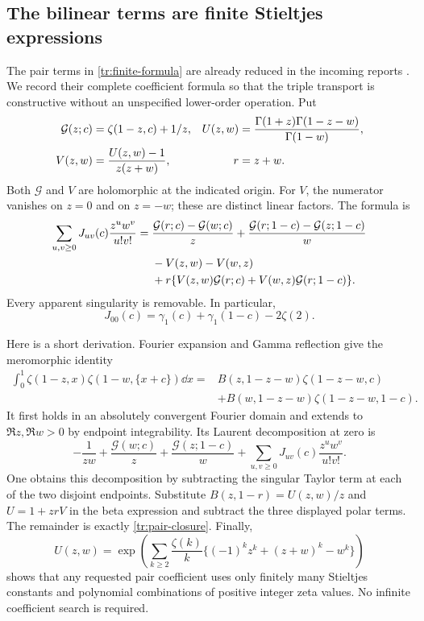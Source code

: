 \subsection{The bilinear terms are finite Stieltjes expressions}
The pair terms in \eqref{tr:finite-formula} are already reduced in the
incoming reports \cite{incoming-sh,incoming-md}. We record their complete
coefficient formula so that the triple transport is constructive without
an unspecified lower-order operation. Put
\begin{align}
 \mathcal G(z;c)&=\zeta(1-z,c)+1/z,
 & U(z,w)&=\frac{\Gamma(1+z)\Gamma(1-z-w)}{\Gamma(1-w)},\notag\\
 V(z,w)&=\frac{U(z,w)-1}{z(z+w)},
 &r&=z+w.\label{tr:pair-generators}
\end{align}
Both $\mathcal G$ and $V$ are holomorphic at the indicated origin. For
$V$, the numerator vanishes on $z=0$ and on $z=-w$; these are distinct
linear factors. The formula is
\begin{align}
 \sum_{u,v\geq0}J_{uv}(c)\frac{z^uw^v}{u!v!}
 ={}&\frac{\mathcal G(r;c)-\mathcal G(w;c)}z
     +\frac{\mathcal G(r;1-c)-\mathcal G(z;1-c)}w\notag\\
 &-V(z,w)-V(w,z)\notag\\
 &+r\{V(z,w)\mathcal G(r;c)
           +V(w,z)\mathcal G(r;1-c)\}.\label{tr:pair-closure}
\end{align}
Every apparent singularity is removable. In particular,
\begin{equation}\label{tr:J00}
 J_{00}(c)=\gamma_1(c)+\gamma_1(1-c)-2\zeta(2).
\end{equation}

Here is a short derivation. Fourier expansion and Gamma reflection give
the meromorphic identity
\begin{align*}
 \int_0^1\zeta(1-z,x)\zeta(1-w,\{x+c\})\dd x
 ={}&B(z,1-z-w)\zeta(1-z-w,c)\\
 &+B(w,1-z-w)\zeta(1-z-w,1-c).
\end{align*}
It first holds in an absolutely convergent Fourier domain and extends
to $\Re z,\Re w>0$ by endpoint integrability. Its Laurent decomposition
at zero is
\[
 -\frac1{zw}+\frac{\mathcal G(w;c)}z
      +\frac{\mathcal G(z;1-c)}w
      +\sum_{u,v\geq0}J_{uv}(c)\frac{z^uw^v}{u!v!}.
\]
One obtains this decomposition by subtracting the singular Taylor term
at each of the two disjoint endpoints. Substitute
$B(z,1-r)=U(z,w)/z$ and $U=1+zrV$ in the beta expression and subtract
the three displayed polar terms. The remainder is exactly
\eqref{tr:pair-closure}.
Finally,
\[
 U(z,w)=\exp\!\left(\sum_{k\geq2}\frac{\zeta(k)}k
             \{(-1)^kz^k+(z+w)^k-w^k\}\right)
\]
shows that any requested pair coefficient uses only finitely many
Stieltjes constants and polynomial combinations of positive integer
zeta values. No infinite coefficient search is required.

